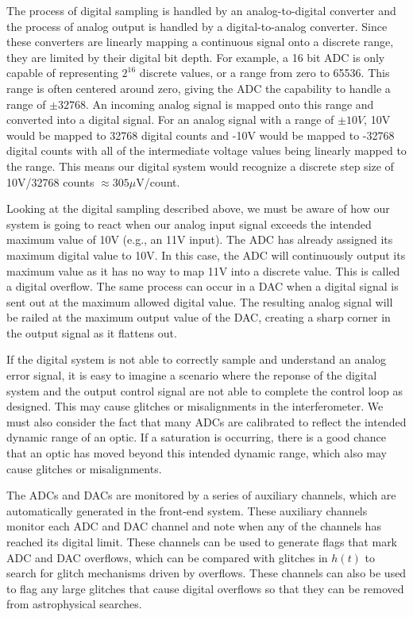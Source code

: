 The process of digital sampling is handled by an analog-to-digital 
converter and the process of analog output is handled by a 
digital-to-analog converter.  Since these converters are linearly 
mapping a continuous signal onto a discrete range, they are limited by 
their digital bit depth.  For example, a 16 bit ADC is only capable of 
representing $2^{16}$ discrete values, or a range from zero to 65536.  
This range is often centered around zero, giving the ADC the capability 
to handle a range of $\pm32768$.  An incoming analog signal is mapped 
onto this range and converted into a digital signal.
For an analog signal with a range of $\pm10V$, 
10V would be mapped to 32768 digital counts and -10V would be mapped 
to -32768 digital counts with all 
of the intermediate voltage values being linearly mapped to the range. This 
means our digital system would recognize a discrete step size of 
10V/32768 counts $\approx 305 \mu $V/count.

Looking at the digital sampling described above, we must be aware of how our system 
is going to react when our analog input signal exceeds the intended maximum 
value of 10V (e.g., an 11V input). The ADC has already assigned its maximum 
digital value to 10V. In this case, the ADC 
will continuously output its maximum value as it has no way to map 11V into 
a discrete value. This is called a digital overflow.  
The same process can occur in a DAC when a digital signal 
is sent out at the maximum allowed digital value. The resulting analog signal 
will be railed at the maximum output value of the DAC, creating a sharp corner 
in the output signal as it flattens out. 

If the digital system is not able to correctly sample and understand an analog 
error signal, it is easy to imagine a scenario where the reponse of the digital 
system and the output control signal are not able to complete the control loop 
as designed. This may cause glitches or misalignments in the interferometer.
We must also consider the fact that many ADCs are calibrated to reflect the 
intended dynamic range of an optic.  If a saturation is occurring, there is 
a good chance that an optic has moved beyond this intended dynamic range, which 
also may cause glitches or misalignments.

The ADCs and DACs are monitored by a series of auxiliary channels, which are 
automatically generated in the front-end system. These auxiliary channels 
monitor each ADC and DAC channel and note when any of the channels has reached 
its digital limit. These channels can be used to generate flags that mark 
ADC and DAC overflows, which can be compared with glitches in $h(t)$ to 
search for glitch mechanisms driven by overflows. These channels can also 
be used to flag any large glitches that cause digital overflows so that they 
can be removed from astrophysical searches. 

